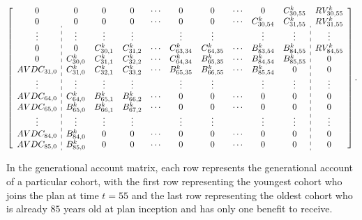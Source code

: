 \documentclass{sfuthesis}
\numberwithin{equation}{chapter}
\begin{document}
		\begin{equation}
		\label{eq:VB_7}
		\left[
		\begin{array}{c:ccccccccc:c}
		0           &0 		       &0             &0             &\cdots & 0             &0             &\cdots  &0 			&C_{30,55}^{k}  &RV_{30,55}^k \\
		0           &0  	       &0 			  &0  			 &\cdots & 0 		  	 &0 			&\cdots  &C_{30,54}^{k} &C_{31,55}^{k}  &RV_{31,55}^k  \\
		\vdots      &\vdots 	   &\vdots 		  &\vdots  	     &       & \vdots 	     &\vdots 	    &        &\vdots 	    &\vdots         &\vdots \\
		0           &0  		   &C_{30,1}^{k}  &C_{31,2}^{k}  &\cdots & C_{63,34}^{k} &C_{64,35}^{k} &\cdots  &B_{83,54}^{k} &B_{84,55}^{k}  &RV_{84,55}^k \\
		0           &C_{30,0}^{k}  &C_{31,1}^{k}  &C_{32,2}^{k}  &\cdots & C_{64,34}^{k} &B_{65,35}^{k} &\cdots  &B_{84,54}^{k} &B_{85,55}^{k}  &0\\
		AVDC_{31,0} &C_{31,0}^{k}  &C_{32,1}^{k}  &C_{33,2}^{k}  &\cdots & B_{65,35}^{k} &B_{66,55}^{k} &\cdots  &B_{85,54}^{k} &0              &0 \\	
		\vdots      &\vdots 	   &\vdots 		  &\vdots  	     &       & \vdots 	     &\vdots 	    &        &\vdots 	    &\vdots         &\vdots  \\
		AVDC_{64,0} &C_{64,0}^{k}  &B_{65,1}^{k}  &B_{66,2}^{k}  &\cdots & 0 		     &0 		    &\cdots  &0 			&0              & 0 \\
		AVDC_{65,0} &B_{65,0}^{k}  &B_{66,1}^{k}  &B_{67,2}^{k}  &\cdots & 0 			 &0 		    &\cdots  &0             &0              &0 \\
		\vdots      &\vdots 	   &\vdots 		  &\vdots  	     &       & \vdots 	     &\vdots 	    &        &\vdots 	    &\vdots         &\vdots  \\
		AVDC_{84,0} &B_{84,0}^{k}  &0             &0  			 &\cdots & 0 			 &0             &\cdots  &0             &0              &0 \\
		AVDC_{85,0} &B_{85,0}^{k}  &0             &0  			 &\cdots & 0 			 &0             &\cdots  &0             &0              &0\\
		\end{array}
		\right].
		\end{equation}
	
	
		\justify
		In the generational account matrix, each row represents the generational account of a particular cohort, with the first row representing the youngest cohort who joins the plan at time $t=55$ and the last row representing the oldest cohort who is already $85$ years old at plan inception and has only one benefit to receive. 
	
\end{document}
